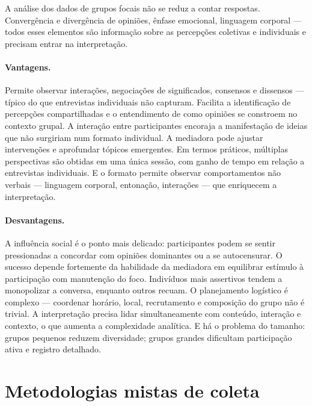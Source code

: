 \documentclass[12pt, a4paper, openany]{book}
\begin{document}
A an\'alise dos dados de grupos focais n\~ao se reduz a contar respostas. Converg\^encia e diverg\^encia de opini\~oes, \^enfase emocional, linguagem corporal --- todos esses elementos s\~ao informa\c{c}\~ao sobre as percep\c{c}\~oes coletivas e individuais e precisam entrar na interpreta\c{c}\~ao.

\paragraph{Vantagens.} Permite observar intera\c{c}\~oes, negocia\c{c}\~oes de significados, consensos e dissensos --- t\'ipico do que entrevistas individuais n\~ao capturam. Facilita a identifica\c{c}\~ao de percep\c{c}\~oes compartilhadas e o entendimento de como opini\~oes se constroem no contexto grupal. A intera\c{c}\~ao entre participantes encoraja a manifesta\c{c}\~ao de ideias que n\~ao surgiriam num formato individual. A mediadora pode ajustar interven\c{c}\~oes e aprofundar t\'opicos emergentes. Em termos pr\'aticos, m\'ultiplas perspectivas s\~ao obtidas em uma \'unica sess\~ao, com ganho de tempo em rela\c{c}\~ao a entrevistas individuais. E o formato permite observar comportamentos n\~ao verbais --- linguagem corporal, entona\c{c}\~ao, intera\c{c}\~oes --- que enriquecem a interpreta\c{c}\~ao.

\paragraph{Desvantagens.} A influ\^encia social \'e o ponto mais delicado: participantes podem se sentir pressionadas a concordar com opini\~oes dominantes ou a se autocensurar. O sucesso depende fortemente da habilidade da mediadora em equilibrar est\'imulo \`a participa\c{c}\~ao com manuten\c{c}\~ao do foco. Indiv\'iduos mais assertivos tendem a monopolizar a conversa, enquanto outros recuam. O planejamento log\'istico \'e complexo --- coordenar hor\'ario, local, recrutamento e composi\c{c}\~ao do grupo n\~ao \'e trivial. A interpreta\c{c}\~ao precisa lidar simultaneamente com conte\'udo, intera\c{c}\~ao e contexto, o que aumenta a complexidade anal\'itica. E h\'a o problema do tamanho: grupos pequenos reduzem diversidade; grupos grandes dificultam participa\c{c}\~ao ativa e registro detalhado.

\section{Metodologias mistas de coleta}
\end{document}
